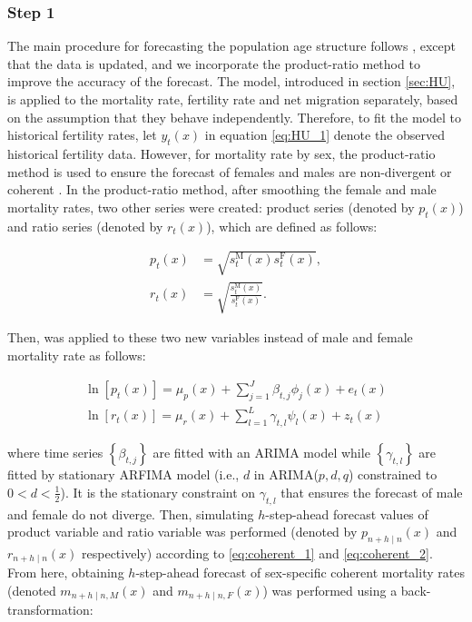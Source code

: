 \documentclass[11pt,a4paper,]{article}
\begin{document}
\subsubsection*{Step 1}\label{step-1}

The main procedure for forecasting the population age structure follows
\textcite{HB08}, except that the data is updated, and we incorporate the
product-ratio method \autocite{HBY13} to improve the accuracy of the
forecast. The \textcite{HU07} model, introduced in section \ref{sec:HU},
is applied to the mortality rate, fertility rate and net migration
separately, based on the assumption that they behave independently.
Therefore, to fit the model to historical fertility rates, let
\(y_t(x)\) in equation \eqref{eq:HU_1} denote the observed historical
fertility data. However, for mortality rate by sex, the product-ratio
method is used to ensure the forecast of females and males are
non-divergent or coherent \autocite{HBY13}. In the product-ratio method,
after smoothing the female and male mortality rates, two other series
were created: product series (denoted by \(p_t(x)\)) and ratio series
(denoted by \(r_t(x)\)), which are defined as follows: \vspace{-.4in}

\begin{align}
  p_t(x)&=\sqrt{s_{t}^{\text{M}}(x)s_{t}^{\text{F}}(x)}, \label{eq:coherent_1}\\
  r_t(x)&=\sqrt{\frac{s_{t}^{\text{M}}(x)}{s_{t}^{\text{F}}(x)}}. \label{eq:coherent_2}
\end{align}

Then, \textcite{HU07} was applied to these two new variables instead of
male and female mortality rate as follows: \vspace{-.3in}

\begin{align*}
  \ln[p_t(x)]=\mu_p(x)+\sum_{j=1}^{J}\beta_{t,j}\phi_j(x)+e_t(x)\\
  \ln[r_t(x)]=\mu_r(x)+\sum_{l=1}^{L}\gamma_{t,l}\psi_l(x)+z_t(x)
\end{align*}

where time series \(\left\{\beta_{t,j}\right\}\) are fitted with an
ARIMA model while \(\left\{\gamma_{t,l}\right\}\) are fitted by
stationary ARFIMA model (i.e., \(d\) in ARIMA(\(p,d,q\)) constrained to
\(0<d<\frac{1}{2}\)). It is the stationary constraint on
\(\gamma_{t,l}\) that ensures the forecast of male and female do not
diverge. Then, simulating \(h\)-step-ahead forecast values of product
variable and ratio variable was performed (denoted by
\(p_{n+h\mid n}(x)\) and \(r_{n+h\mid n}(x)\) respectively) according to
\eqref{eq:coherent_1} and \eqref{eq:coherent_2}. From here, obtaining
\(h\)-step-ahead forecast of sex-specific coherent mortality rates
(denoted \(m_{n+h\mid n,M}(x)\) and \(m_{n+h\mid n,F}(x)\)) was
performed using a back-transformation: \vspace{-.3in}
\end{document}
